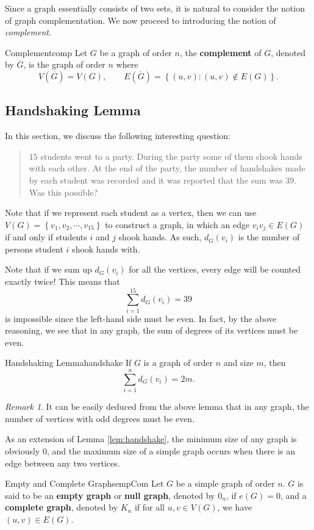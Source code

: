 \documentclass[math]{amznotes}
\theoremstyle{remark}
\newtheorem*{remark}{Remark}
\begin{document}
Since a graph essentially consists of two sets, it is natural to consider the notion of graph complementation. We now proceed to introducing the notion of \textit{complement}.
\begin{dfnbox}{Complement}{comp}
    Let $G$ be a graph of order $n$, the {\color{red} \textbf{complement}} of $G$, denoted by $\overline{G}$, is the graph of order $n$ where
    \begin{equation*}
        V\left(\overline{G}\right) = V(G), \qquad E\left(\overline{G}\right) = \left\{(u, v) \colon (u, v) \notin E(G)\right\}.
    \end{equation*}
\end{dfnbox}
\subsection{Handshaking Lemma}
In this section, we discuss the following interesting question:
\begin{quote}
    $15$ students went to a party. During the party some of them shook hands with each other. At the end of the party, the number of handshakes made by each student was recorded and it was reported that the sum was $39$. Was this possible?
\end{quote}
Note that if we represent each student as a vertex, then we can use $V(G) = \left\{v_1, v_2, \cdots, v_{15}\right\}$ to construct a graph, in which an edge $v_iv_j \in E(G)$ if and only if students $i$ and $j$ shook hands. As such, $d_G(v_i)$ is the number of persons student $i$ shook hands with.

Note that if we sum up $d_G(v_i)$ for all the vertices, every edge will be counted exactly twice! This means that
\begin{equation*}
    \sum_{i = 1}^{15}d_G(v_i) = 39
\end{equation*}
is impossible since the left-hand side must be even. In fact, by the above reasoning, we see that in any graph, the sum of degrees of its vertices must be even.
\begin{lembox}{Handshaking Lemma}{handshake}
    If $G$ is a graph of order $n$ and size $m$, then
    \begin{equation*}
        \sum_{i = 1}^{n}d_G(v_i) = 2m.
    \end{equation*}
\end{lembox}
\begin{notebox}
    \begin{remark}
        It can be easily deduced from the above lemma that in any graph, the number of vertices with odd degrees must be even.
    \end{remark}
\end{notebox}
As an extension of Lemma \ref{lem:handshake}, the minimum size of any graph is obviously $0$, and the maximum size of a simple graph occurs when there is an edge between any two vertices.
\begin{dfnbox}{Empty and Complete Graphs}{empCom}
    Let $G$ be a simple graph of order $n$. $G$ is said to be an {\color{red} \textbf{empty graph}} or {\color{red} \textbf{null graph}}, denoted by $0_n$, if $e(G) = 0$, and a {\color{red} \textbf{complete graph}}, denoted by $K_n$ if for all $u, v \in V(G)$, we have $(u, v) \in E(G)$. 
\end{dfnbox}
\end{document}
